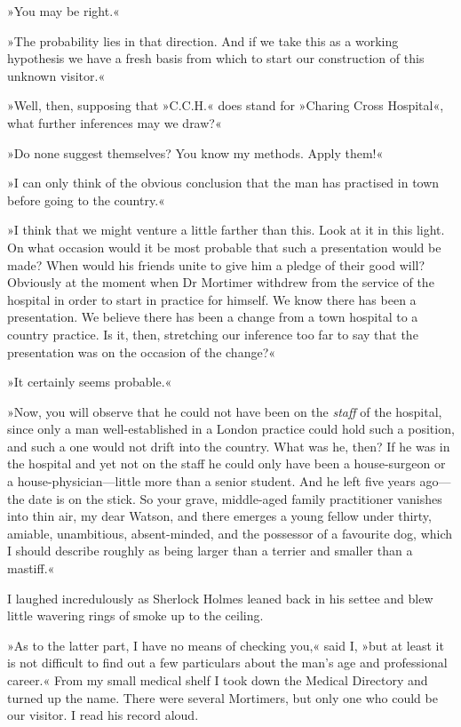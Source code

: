 »You may be right.«

»The probability lies in that direction. And if we take this as a working hypothesis we have a fresh basis from which to start our construction of this unknown visitor.«

»Well, then, supposing that »C.C.H.« does stand for »Charing Cross Hospital«, what further inferences may we draw?«

»Do none suggest themselves? You know my methods. Apply them!«

»I can only think of the obvious conclusion that the man has practised in town before going to the country.«

»I think that we might venture a little farther than this. Look at it in this light. On what occasion would it be most probable that such a presentation would be made? When would his friends unite to give him a pledge of their good will? Obviously at the moment when Dr Mortimer withdrew from the service of the hospital in order to start in practice for himself. We know there has been a presentation. We believe there has been a change from a town hospital to a country practice. Is it, then, stretching our inference too far to say that the presentation was on the occasion of the change?«

»It certainly seems probable.«

»Now, you will observe that he could not have been on the \emph{staff} of the hospital, since only a man well-established in a London practice could hold such a position, and such a one would not drift into the country. What was he, then? If he was in the hospital and yet not on the staff he could only have been a house-surgeon or a house-physician\allowbreak---\allowbreak little more than a senior student. And he left five years ago\allowbreak---\allowbreak the date is on the stick. So your grave, middle-aged family practitioner vanishes into thin air, my dear Watson, and there emerges a young fellow under thirty, amiable, unambitious, absent-minded, and the possessor of a favourite dog, which I should describe roughly as being larger than a terrier and smaller than a mastiff.«

I laughed incredulously as Sherlock Holmes leaned back in his settee and blew little wavering rings of smoke up to the ceiling.

»As to the latter part, I have no means of checking you,« said I, »but at least it is not difficult to find out a few particulars about the man's age and professional career.« From my small medical shelf I took down the Medical Directory and turned up the name. There were several Mortimers, but only one who could be our visitor. I read his record aloud.

